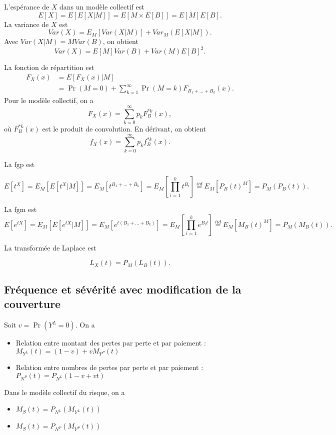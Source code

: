 L'espérance de $X$ dans un modèle collectif est 
$$E[X] = E[E[X \vert M]] = E[M \times E[B]] = E[M]E[B].$$
La variance de $X$ est 
$$Var(X) = E_M[Var(X\vert M)] + Var_M(E[X \vert M]).$$
Avec $Var(X \vert M) = M Var(B)$, on obtient
$$Var(X) = E[M]Var(B) + Var(M)E[B]^2.$$

La fonction de répartition est 
\begin{align*}
	F_X(x) & = E[F_X(x) \vert M]                                                      \\
	       & = \Pr(M = 0) + \sum_{k = 1}^{\infty} \Pr(M = k)F_{B_1 + \dots + B_k}(x).
\end{align*}
Pour le modèle collectif, on a 
$$F_X(x) = \sum_{k = 0}^{\infty} p_k F_B^{*k}(x),$$
où $F_B^{*k}(x)$ est le produit de convolution. En dérivant, on obtient
$$f_X(x) = \sum_{k = 0}^{\infty} p_k f_B^{*k}(x).$$

La fgp est 

$$E\left[t^{X}\right] = E_M\left[E\left[t^{X}\vert M\right]\right] = E_M\left[t^{B_1 + \dots + B_k}\right] = E_M\left[\prod_{i = 1}^{k}t^{B_i}\right] \stackrel{iid}{=} E_M\left[P_B(t)^M\right] = P_M(P_B(t)).$$

La fgm est 
$$E\left[e^{tX}\right] = E_M\left[E\left[e^{tX}\vert M\right]\right] = E_M\left[e^{t(B_1 + \dots + B_k)}\right] = E_M\left[\prod_{i = 1}^{k}e^{B_it}\right] \stackrel{iid}{=} E_M\left[M_B(t)^M\right] = P_M(M_B(t)).$$

La transformée de Laplace est 

$$L_X(t) = P_M(L_B(t)).$$

\subsection{Fréquence et sévérité avec modification de la couverture}

Soit $v = \Pr(Y^L = 0)$. On a 
\begin{itemize}
	\item Relation entre montant des pertes par perte et par paiement : $\displaystyle M_{Y^L}(t) = (1-v) + vM_{Y^P}(t)$
	\item Relation entre nombres de pertes par perte et par paiement : $\displaystyle P_{N^P}(t) = P_{N^L}(1-v + vt)$
\end{itemize}
Dans le modèle collectif du risque, on a 
\begin{itemize}
	\item $\displaystyle M_S(t) = P_{N^L}\left(M_{Y^L}(t)\right)$
	\item $\displaystyle M_S(t) = P_{N^P}\left(M_{Y^P}(t)\right)$
\end{itemize}

